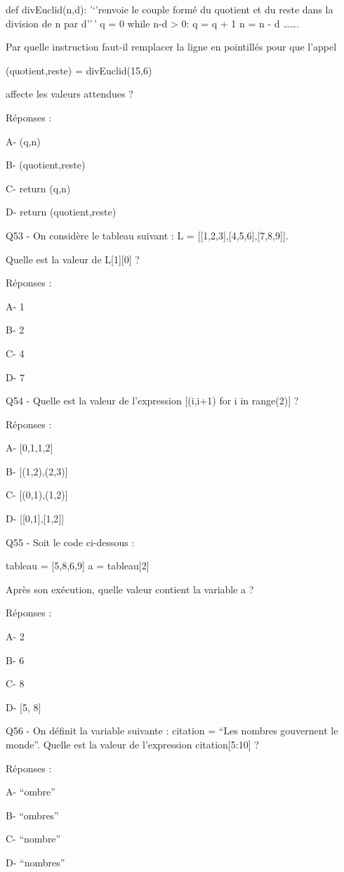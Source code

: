 \documentclass[
]{book}
\begin{document}
def divEuclid(n,d):
'`'renvoie le couple formé du quotient et du reste dans la division de n par d''\,'
q = 0
while n-d \textgreater{} 0:
q = q + 1
n = n - d
\ldots\ldots.

Par quelle instruction faut-il remplacer la ligne en pointillés pour que l'appel

(quotient,reste) = divEuclid(15,6)

affecte les valeurs attendues ?

Réponses :

A- (q,n)

B- (quotient,reste)

C- return (q,n)

D- return (quotient,reste)

Q53 - On considère le tableau suivant : L = {[}{[}1,2,3{]},{[}4,5,6{]},{[}7,8,9{]}{]}.

Quelle est la valeur de L{[}1{]}{[}0{]} ?

Réponses :

A- 1

B- 2

C- 4

D- 7

Q54 - Quelle est la valeur de l'expression {[}(i,i+1) for i in range(2){]} ?

Réponses :

A- {[}0,1,1,2{]}

B- {[}(1,2),(2,3){]}

C- {[}(0,1),(1,2){]}

D- {[}{[}0,1{]},{[}1,2{]}{]}

Q55 - Soit le code ci-dessous :

tableau = {[}5,8,6,9{]}
a = tableau{[}2{]}

Après son exécution, quelle valeur contient la variable a ?

Réponses :

A- 2

B- 6

C- 8

D- {[}5, 8{]}

Q56 - On définit la variable suivante : citation = ``Les nombres gouvernent le monde''. Quelle est la valeur de l'expression citation{[}5:10{]} ?

Réponses :

A- ``ombre''

B- ``ombres''

C- ``nombre''

D- ``nombres''
\end{document}
